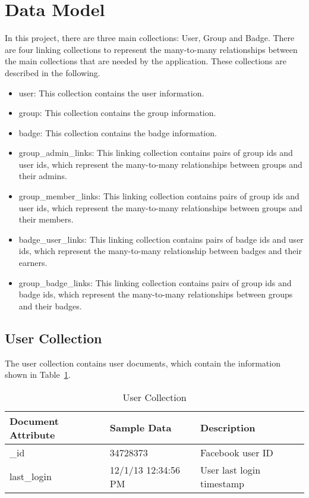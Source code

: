\section{Data Model}
In this project, there are three main collections: User, Group and Badge.  There are four linking collections to represent the many-to-many relationships between the main collections that are needed by the application.  These collections are described in the following.

\begin{itemize}
\item user: This collection contains the user information.
\item group: This collection contains the group information.  
\item badge: This collection contains the badge information.
\item group{\_}admin{\_}links: This linking collection contains pairs of group ids and user ids, which represent the many-to-many relationships between groups and their admins.
\item group{\_}member{\_}links: This linking collection contains pairs of group ids and user ids, which represent the many-to-many relationships between groups and their members.
\item badge{\_}user{\_}links: This linking collection contains pairs of badge ids and user ids, which represent the many-to-many relationship between badges and their earners.
\item group{\_}badge{\_}links: This linking collection contains pairs of group ids and badge ids, which represent the many-to-many relationships between groups and their badges.
\end{itemize}

\subsection{User Collection}
The user collection contains user documents, which contain the information shown in Table~\ref{table:UserCollection}.

\begin{table}[H]
\caption{User Collection}
\label{table:UserCollection}
\textbf{ }
\begin{center}
\begin{tabular}{ | l | l |  l | }
\hline
Document Attribute & Sample Data & Description \\ \hline
{\_}id & 34728373 & Facebook user ID \\ \hline
last{\_}login & 12/1/13 12:34:56 PM & User last login timestamp   \\ \hline
\end{tabular}
\end{center}
\end{table}

